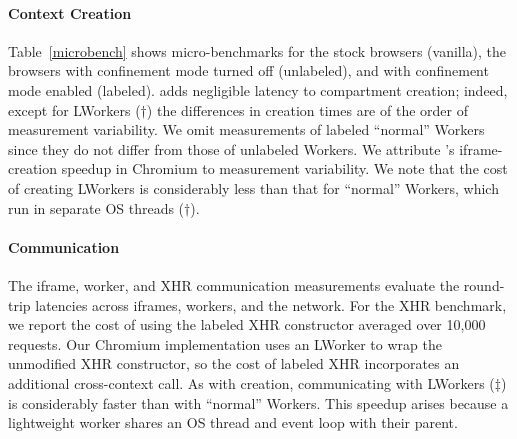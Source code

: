 \paragraph{Context Creation}
Table~\ref{microbench} shows micro-benchmarks for the stock
browsers (vanilla), the \sys{} browsers with confinement mode turned
off (unlabeled), and with confinement mode enabled (labeled).
%
\sys{} adds negligible latency to compartment creation; indeed, except
for LWorkers ($\dagger$) the differences in creation times are of the
order of measurement variability.
%
We omit measurements of labeled ``normal'' Workers since they do
not differ from those of unlabeled Workers.
%
We attribute \sys{}'s iframe-creation speedup in Chromium to measurement
variability.
%
We note that the cost of creating LWorkers is
considerably less than that for ``normal'' Workers, which run in
separate OS threads ($\dagger$).

\paragraph{Communication} The iframe, worker, and XHR communication measurements evaluate the
round-trip latencies across iframes, workers, and the network.
%
For the XHR benchmark, we report the cost of using the labeled XHR
constructor averaged over 10,000 requests.
%
Our Chromium implementation uses an  LWorker to wrap the unmodified
XHR constructor, so the cost of labeled XHR incorporates an additional
cross-context call.
%
As with creation, communicating with LWorkers ($\ddagger$)
is considerably faster than with ``normal'' Workers.
%
This speedup arises because a lightweight worker shares
 an OS thread and event loop with their parent.
%



